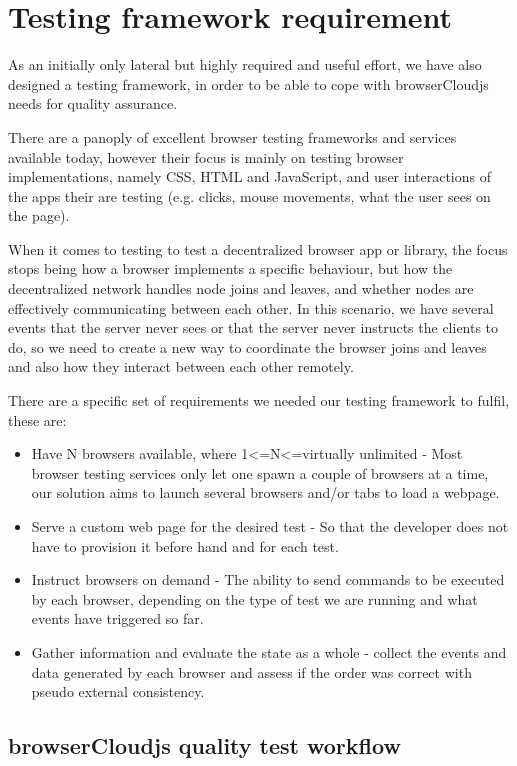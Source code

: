 \section{Testing framework requirement}

As an initially only lateral but highly required and useful effort, we have also designed a testing framework, in order to be able to cope with browserCloudjs needs for quality assurance.

There are a panoply of excellent browser testing frameworks and services available today, however their focus is mainly on testing browser implementations, namely CSS, HTML and JavaScript, and user interactions of the apps their are testing (e.g. clicks, mouse movements, what the user sees on the page).

When it comes to testing to test a decentralized browser app or library, the focus stops being how a browser implements a specific behaviour, but how the decentralized network handles node joins and leaves, and whether nodes are effectively communicating between each other. In this scenario, we have several events that the server never sees or that the server never instructs the clients to do, so we need to create a new way to coordinate the browser joins and leaves and also how they interact between each other remotely.

There are a specific set of requirements we needed our testing framework to fulfil, these are:

\begin{itemize}
    \item Have N browsers available, where 1\textless=N\textless=virtually unlimited - Most browser testing services only let one spawn a couple of browsers at a time, our solution aims to launch several browsers and/or tabs to load a webpage.
    \item Serve a custom web page for the desired test - So that the developer does not have to provision it before hand and for each test.
    \item Instruct browsers on demand - The ability to send commands to be executed by each browser, depending on the type of test we are running and what events have triggered so far.
    \item Gather information and evaluate the state as a whole - collect the events and data generated by each browser and assess if the order was correct with pseudo external consistency.
\end{itemize}

\subsection{browserCloudjs quality test workflow}

